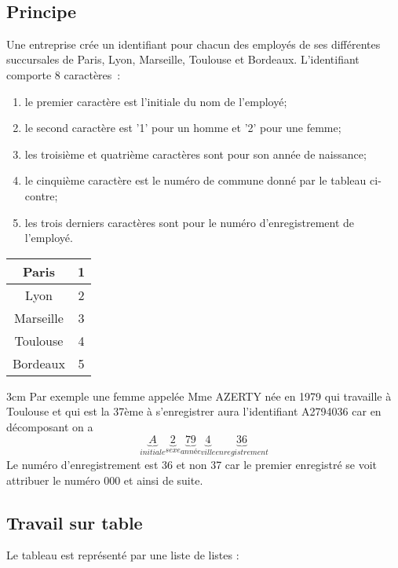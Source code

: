 \documentclass[a4paper,11pt,french]{book}
\begin{document}
	\\
	
\subsection{Principe}

Une entreprise crée un identifiant pour chacun des employés de ses différentes succursales de Paris, Lyon, Marseille, Toulouse et Bordeaux. L’identifiant comporte 8 caractères :\\ 

\double
{
	\begin{enumerate}[--]
		\item 	le premier caractère est l’initiale du nom de l’employé;
		\item 	le second caractère est '1' pour un homme et '2' pour une femme;
		\item 	les troisième et quatrième caractères sont pour son année de naissance;
		\item 	le cinquième caractère est le numéro de commune donné par le tableau ci-contre;
		\item 	les trois derniers caractères sont pour le numéro d’enregistrement de l’employé.\\
		
	\end{enumerate}
}
{
\begin{tabular}{|c|c|}
	\hline
	Paris & 1\\
	\hline
	Lyon & 2\\
	\hline
	Marseille & 3 \\
	\hline
	Toulouse & 4 \\
	\hline
	Bordeaux & 5 \\
	\hline
\end{tabular}
}
{3cm}
Par exemple une femme appelée Mme AZERTY née en 1979 qui travaille à Toulouse et qui est la 37ème à s’enregistrer aura
l’identifiant A2794036 car en décomposant on a 
$$\underbrace{A}_{initiale}\underbrace{2}_{sexe}\underbrace{79}_{année}\underbrace{4}_{ville}\underbrace{36}_{enregistrement}$$
Le numéro d'enregistrement est 36 et non 37 car le premier enregistré se voit attribuer le numéro 000 et ainsi de suite.

\subsection{Travail sur table}

Le tableau est représenté par une liste de listes : \\
\end{document}

